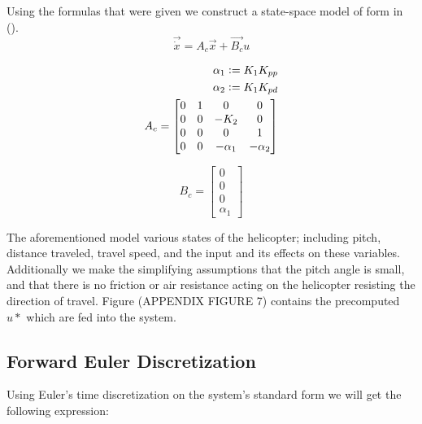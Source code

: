 Using the formulas that were given we construct a state-space model of form in ().
\begin{equation}\label{eq:state-space}
	\vec{\dot{x}} = A_c \vec{x} + \vec{B_c} u
\end{equation}

\begin{subequations}
\begin{align}
\alpha_1 \vcentcolon= K_1K_{pp} \\
\alpha_2 \vcentcolon= K_1K_{pd} \\
A_c =
\begin{bmatrix}
    0 & 1 & 0 & 0 \\
    0 & 0 & -K_2 & 0 \\
    0 & 0 & 0 & 1 \\
    0 & 0 & -\alpha_1 & - \alpha_2
\end{bmatrix}
\label{eq:initial_state}
\end{align}
\end{subequations}

\begin{equation}
B_c =
\begin{bmatrix}
	0 \\
	0 \\
	0 \\
	\alpha_1
\end{bmatrix}
\end{equation}

The aforementioned model various states of the helicopter; including pitch, distance traveled, travel speed, and the input and its effects on these variables. Additionally we make the  simplifying assumptions that the pitch angle is small, and that there is no friction or air resistance acting on the helicopter resisting the direction of travel. Figure (APPENDIX FIGURE 7) contains the precomputed $u*$ which are fed into the system.

\subsection{Forward Euler Discretization}

Using Euler's time discretization on the system's standard form we will get the following expression:

